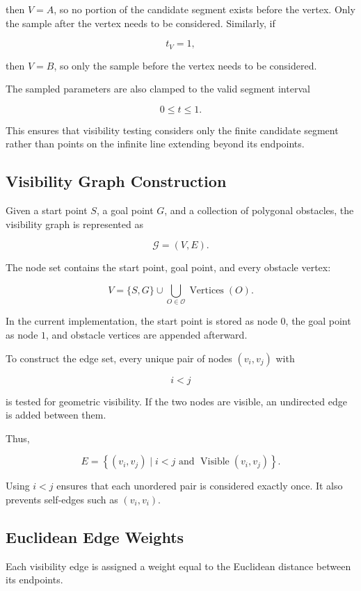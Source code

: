 then $V=A$, so no portion of the candidate segment exists before the vertex.
Only the sample after the vertex needs to be considered. Similarly, if

\[
t_V=1,
\]

then $V=B$, so only the sample before the vertex needs to be considered.

The sampled parameters are also clamped to the valid segment interval

\[
0 \leq t \leq 1.
\]

This ensures that visibility testing considers only the finite candidate
segment rather than points on the infinite line extending beyond its
endpoints.

\subsection{Visibility Graph Construction}

Given a start point $S$, a goal point $G$, and a collection of polygonal
obstacles, the visibility graph is represented as

\[
\mathcal{G} = (V,E).
\]

The node set contains the start point, goal point, and every obstacle vertex:

\[
V =
\{S,G\}
\cup
\bigcup_{O \in \mathcal{O}}
\operatorname{Vertices}(O).
\]

In the current implementation, the start point is stored as node $0$, the
goal point as node $1$, and obstacle vertices are appended afterward.

To construct the edge set, every unique pair of nodes $(v_i,v_j)$ with

\[
i < j
\]

is tested for geometric visibility. If the two nodes are visible, an
undirected edge is added between them.

Thus,

\[
E =
\left\{
(v_i,v_j)
\mid
i < j
\text{ and }
\operatorname{Visible}(v_i,v_j)
\right\}.
\]

Using $i<j$ ensures that each unordered pair is considered exactly once. It
also prevents self-edges such as $(v_i,v_i)$.

\subsection{Euclidean Edge Weights}

Each visibility edge is assigned a weight equal to the Euclidean distance
between its endpoints.

